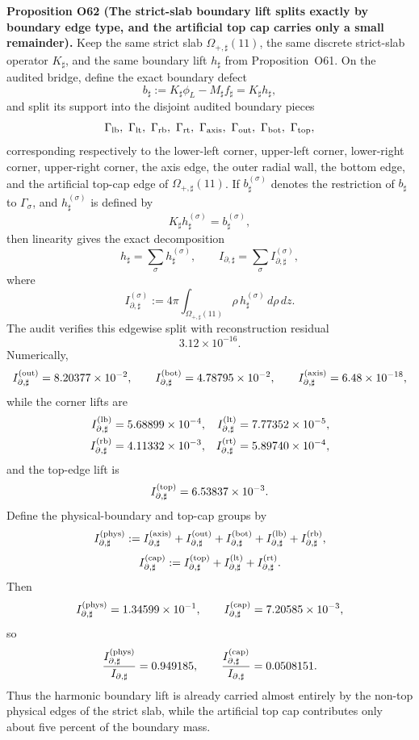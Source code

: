 \documentclass[aps,prd,onecolumn,notitlepage,nofootinbib,superscriptaddress,11pt,floatfix]{revtex4-2}
\begin{document}
\medskip\noindent\textbf{Proposition O62 (The strict-slab boundary lift splits exactly by boundary edge type, and the artificial top cap carries only a small remainder).}
Keep the same strict slab \(\Omega_{+,\sharp}(11)\), the same discrete strict-slab operator \(K_\sharp\), and the same boundary lift \(h_\sharp\) from Proposition~O61.  On the audited bridge, define the exact boundary defect
\[
b_\sharp:=K_\sharp \phi_L-M_\sharp f_\sharp = K_\sharp h_\sharp,
\]
and split its support into the disjoint audited boundary pieces
\[
\Gamma_{\rm lb},\ \Gamma_{\rm lt},\ \Gamma_{\rm rb},\ \Gamma_{\rm rt},\ \Gamma_{\rm axis},\ \Gamma_{\rm out},\ \Gamma_{\rm bot},\ \Gamma_{\rm top},
\]
corresponding respectively to the lower-left corner, upper-left corner, lower-right corner, upper-right corner, the axis edge, the outer radial wall, the bottom edge, and the artificial top-cap edge of \(\Omega_{+,\sharp}(11)\).  If \(b_\sharp^{(\sigma)}\) denotes the restriction of \(b_\sharp\) to \(\Gamma_\sigma\), and \(h_\sharp^{(\sigma)}\) is defined by
\[
K_\sharp h_\sharp^{(\sigma)}=b_\sharp^{(\sigma)},
\]
then linearity gives the exact decomposition
\[
h_\sharp=\sum_{\sigma} h_\sharp^{(\sigma)},
\qquad
I_{\partial,\sharp}=\sum_{\sigma} I_{\partial,\sharp}^{(\sigma)},
\]
where
\[
I_{\partial,\sharp}^{(\sigma)}
:=
4\pi\int_{\Omega_{+,\sharp}(11)} \rho\,h_\sharp^{(\sigma)}\,d\rho\,dz.
\]
The audit
verifies this edgewise split with reconstruction residual
\[
3.12\times10^{-16}.
\]
Numerically,
\[
I_{\partial,\sharp}^{(\rm out)}=8.20377\times10^{-2},
\qquad
I_{\partial,\sharp}^{(\rm bot)}=4.78795\times10^{-2},
\qquad
I_{\partial,\sharp}^{(\rm axis)}=6.48\times10^{-18},
\]
while the corner lifts are
\[
\begin{aligned}
I_{\partial,\sharp}^{(\rm lb)}&=5.68899\times10^{-4},&
I_{\partial,\sharp}^{(\rm lt)}&=7.77352\times10^{-5},\\
I_{\partial,\sharp}^{(\rm rb)}&=4.11332\times10^{-3},&
I_{\partial,\sharp}^{(\rm rt)}&=5.89740\times10^{-4},
\end{aligned}
\]
and the top-edge lift is
\[
I_{\partial,\sharp}^{(\rm top)}=6.53837\times10^{-3}.
\]
Define the physical-boundary and top-cap groups by
\[
I_{\partial,\sharp}^{(\rm phys)}
:=
I_{\partial,\sharp}^{(\rm axis)}
+
I_{\partial,\sharp}^{(\rm out)}
+
I_{\partial,\sharp}^{(\rm bot)}
+
I_{\partial,\sharp}^{(\rm lb)}
+
I_{\partial,\sharp}^{(\rm rb)},
\]
\[
I_{\partial,\sharp}^{(\rm cap)}
:=
I_{\partial,\sharp}^{(\rm top)}
+
I_{\partial,\sharp}^{(\rm lt)}
+
I_{\partial,\sharp}^{(\rm rt)}.
\]
Then
\[
I_{\partial,\sharp}^{(\rm phys)}=1.34599\times10^{-1},
\qquad
I_{\partial,\sharp}^{(\rm cap)}=7.20585\times10^{-3},
\]
so
\[
\frac{I_{\partial,\sharp}^{(\rm phys)}}{I_{\partial,\sharp}}=0.949185,
\qquad
\frac{I_{\partial,\sharp}^{(\rm cap)}}{I_{\partial,\sharp}}=0.0508151.
\]
Thus the harmonic boundary lift is already carried almost entirely by the non-top physical edges of the strict slab, while the artificial top cap contributes only about five percent of the boundary mass.
\end{document}
